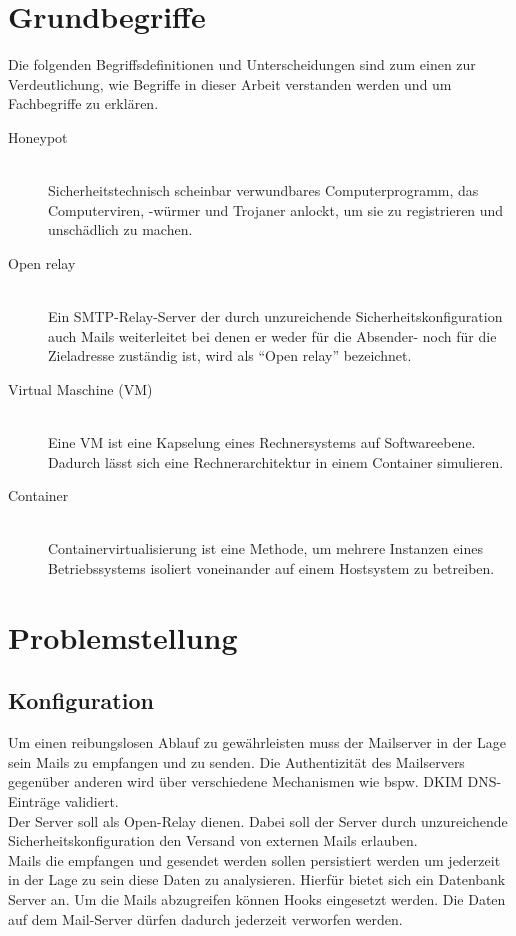 \documentclass[a4paper,11pt,singlespacing]{article}
\begin{document}
\section{Grundbegriffe}\label{sec:Grundbegriffe}
	Die folgenden Begriffsdefinitionen und Unterscheidungen sind zum einen zur Verdeutlichung, wie Begriffe in dieser Arbeit verstanden werden und um Fachbegriffe zu erklären.
	
	\begin{description}
	\item[Honeypot\label{itm:Honeypot}]\hfill \\
		Sicherheitstechnisch scheinbar verwundbares Computerprogramm, das Computerviren, -würmer und Trojaner anlockt, um sie zu registrieren und unschädlich zu machen.\cite{Honeypot}
	\item[Open relay\label{itm:OpenRelay}]\hfill \\
	Ein SMTP-Relay-Server der durch unzureichende Sicherheitskonfiguration auch Mails weiterleitet bei denen er weder für die Absender- noch für die Zieladresse zuständig ist, wird als "`Open relay"' bezeichnet.\cite{SMTP-Relay-Server}
	\item[Virtual Maschine (VM)\label{itm:VirtualMaschine}]\hfill \\
	Eine VM ist eine Kapselung eines Rechnersystems auf Softwareebene. Dadurch lässt sich eine Rechnerarchitektur in einem Container simulieren. \cite{}
	\item[Container\label{itm:Container}]\hfill \\
	Containervirtualisierung ist eine Methode, um mehrere Instanzen eines Betriebssystems isoliert voneinander auf einem Hostsystem zu betreiben.\cite{}
	\end{description}


\section{Problemstellung}\label{sec:Problemstellung}
	\subsection{Konfiguration}\label{sec:ProblemstellungKonfiguration}
		Um einen reibungslosen Ablauf zu gewährleisten muss der Mailserver in der Lage sein Mails zu empfangen und zu senden.
		Die Authentizität des Mailservers gegenüber anderen wird über verschiedene Mechanismen wie bspw. DKIM DNS-Einträge validiert. %
		\\
		Der Server soll als Open-Relay dienen. %
		Dabei soll der Server durch unzureichende Sicherheitskonfiguration den Versand von externen Mails erlauben.
		\\
		Mails die empfangen und gesendet werden sollen persistiert werden um jederzeit in der Lage zu sein diese Daten zu analysieren.
		Hierfür bietet sich ein Datenbank Server an. Um die Mails abzugreifen können Hooks eingesetzt werden. %
		Die Daten auf dem Mail-Server dürfen dadurch jederzeit verworfen werden.
\end{document}
